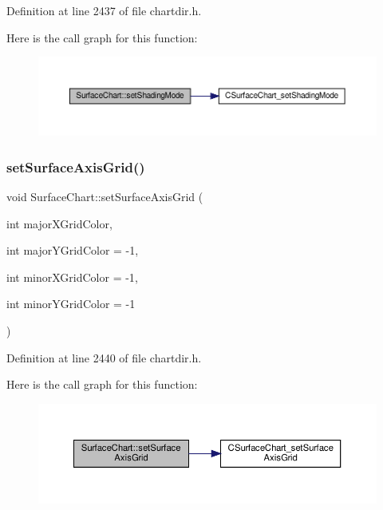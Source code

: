Definition at line 2437 of file chartdir.\+h.

Here is the call graph for this function\+:
\nopagebreak
\begin{figure}[H]
\begin{center}
\leavevmode
\includegraphics[width=350pt]{class_surface_chart_afde084d320bd98c83da03762f134ed59_cgraph}
\end{center}
\end{figure}
\mbox{\label{class_surface_chart_adadc7459ccf0e2aa4d32d52f5d3ea4b2}} 
\subsubsection{\texorpdfstring{set\+Surface\+Axis\+Grid()}{setSurfaceAxisGrid()}}
{\footnotesize\ttfamily void Surface\+Chart\+::set\+Surface\+Axis\+Grid (\begin{DoxyParamCaption}\item[{int}]{major\+X\+Grid\+Color,  }\item[{int}]{major\+Y\+Grid\+Color = {\ttfamily -\/1},  }\item[{int}]{minor\+X\+Grid\+Color = {\ttfamily -\/1},  }\item[{int}]{minor\+Y\+Grid\+Color = {\ttfamily -\/1} }\end{DoxyParamCaption})\hspace{0.3cm}{\ttfamily [inline]}}



Definition at line 2440 of file chartdir.\+h.

Here is the call graph for this function\+:
\nopagebreak
\begin{figure}[H]
\begin{center}
\leavevmode
\includegraphics[width=350pt]{class_surface_chart_adadc7459ccf0e2aa4d32d52f5d3ea4b2_cgraph}
\end{center}
\end{figure}
\mbox{\label{class_surface_chart_ad048fb7f9b93ec63ae529bba894cea39}} 

